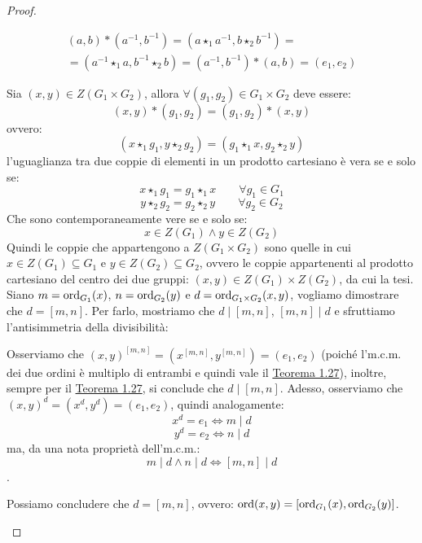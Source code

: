\documentclass[11pt]{scrartcl}
\begin{document}
\begin{proof}
\begin{enumerate}[(1)]
\begin{enumerate}[(a)]
		\begin{multline*}
		(a,b) \ast (a^{-1},b^{-1}) = (a \star_1 a^{-1}, b \star_2 b^{-1}) =\\
		= (a^{-1} \star_1 a, b^{-1} \star_2 b) = (a^{-1},b^{-1}) \ast (a,b) = (e_1,e_2)
		\end{multline*}
		\end{enumerate}
	\ii Sia $(x,y) \in Z(G_1 \times G_2)$, allora $\forall (g_1, g_2) \in G_1 \times G_2$ deve essere:
		\[  (x,y) \ast (g_1, g_2) = (g_1, g_2) \ast (x,y)
		\]
		ovvero:
		\[ (x \star_1 g_1, y \star_2 g_2) = (g_1 \star_1 x, g_2 \star_2 y)
		\]
		l'uguaglianza tra due coppie di elementi in un prodotto cartesiano è vera se e solo se:
			\[ x \star_1 g_1 = g_1 \star_1 x
			\qquad
			\forall g_1 \in G_1
			\]
			\[ y \star_2 g_2 = g_2 \star_2 y
			\qquad
			\forall g_2 \in G_2
			\]
			Che sono contemporaneamente vere se e solo se:
			\[ x \in Z(G_1) \land y \in Z(G_2)
			\]
			Quindi le coppie che appartengono a $Z(G_1 \times G_2)$ sono quelle in cui $x \in Z(G_1) \subseteq G_1$ e $y \in Z(G_2) \subseteq G_2$, ovvero le coppie appartenenti al prodotto cartesiano del centro dei due gruppi: $(x,y) \in Z(G_1) \times Z(G_2)$, da cui la tesi.
			\ii Siano $m=\operatorname{ord}_{G_1}(x)$, $n=\operatorname{ord}_{G_2}(y)$ e $d=\operatorname{ord}_{G_1 \times G_2}(x,y)$, vogliamo dimostrare che $d=[m,n]$. Per farlo, mostriamo che $d \mid [m,n]$, $[m,n] \mid d$ e sfruttiamo l'antisimmetria della divisibilità:
				\begin{enumerate}[(a)]
				\ii Osserviamo che $(x,y)^{[m,n]} = (x^{[m,n]},y^{[m,n]})=(e_1,e_2)$ (poiché l'm.c.m. dei due ordini è multiplo di entrambi e quindi vale il \hyperref[thm:g_due]{Teorema 1.27}), inoltre, sempre per il \hyperref[thm:g_due]{Teorema 1.27}, si conclude che $d \mid [m,n]$.
				\ii Adesso, osserviamo che $(x,y)^d=(x^d,y^d)=(e_1,e_2)$, quindi analogamente:
					\[ x^d=e_1 \iff m \mid d 
					\]
					\[ y^d=e_2 \iff n \mid d
					\]
				ma, da una nota proprietà dell'm.c.m.:
					\[ m \mid d \land n \mid d \iff [m,n] \mid d
					\]
.
				\end{enumerate}
	Possiamo concludere che $d=[m,n]$, ovvero: $\operatorname{ord}(x,y)=[\operatorname{ord}_{G_1}(x),\operatorname{ord}_{G_2}(y)]$.
	\end{enumerate}
\end{proof}
\end{document}
